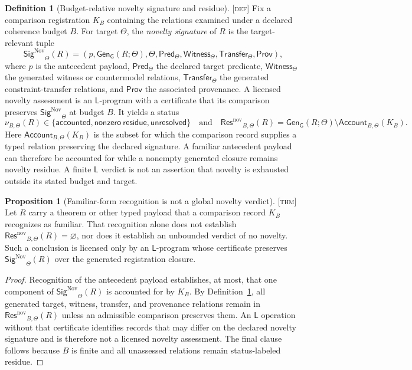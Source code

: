 \documentclass[11pt]{article}
\newcommand{\GOp}{\ensuremath{\mathsf{G}}}
\newcommand{\LOp}{\ensuremath{\mathsf{L}}}
\newcommand{\GenClos}{\ensuremath{\mathsf{Gen}_{\GOp}}}
\newcommand{\NovSig}{\ensuremath{\mathsf{Sig}^{\mathrm{Nov}}}}
\newcommand{\NovRes}{\ensuremath{\mathsf{Res}^{\mathrm{nov}}}}
\newcommand{\Defn}{\textsc{[def]}}
\newcommand{\Thm}{\textsc{[thm]}}
\theoremstyle{definition}
\newtheorem{sdefinition}{Definition}
\newtheorem{sproposition}{Proposition}
\begin{document}
\begin{sdefinition}[Budget-relative novelty signature and residue]
\label{def:novelty-residue}
\Defn{} Fix a comparison registration $K_B$ containing the relations examined
under a declared coherence budget $B$. For target $\Theta$, the
\emph{novelty signature} of $R$ is the target-relevant tuple
\begin{equation}
\NovSig_{\Theta}(R)=
\left(
 p,\GenClos(R;\Theta),\Theta,
 \mathsf{Pred}_{\Theta},\mathsf{Witness}_{\Theta},
 \mathsf{Transfer}_{\Theta},\mathsf{Prov}
\right),
\label{eq:novelty-signature}
\end{equation}
where $p$ is the antecedent payload, $\mathsf{Pred}_{\Theta}$ the declared target
predicate, $\mathsf{Witness}_{\Theta}$ the generated witness or countermodel
relations, $\mathsf{Transfer}_{\Theta}$ the generated constraint-transfer
relations, and $\mathsf{Prov}$ the associated provenance. A licensed novelty
assessment is an $\LOp$-program with a certificate that its comparison preserves
$\NovSig_{\Theta}$ at budget $B$. It yields a status
\begin{equation}
\nu_{B,\Theta}(R)\in
\{\mathsf{accounted},\mathsf{nonzero\ residue},\mathsf{unresolved}\}
\quad\text{and}\quad
\NovRes_{B,\Theta}(R)
 =\GenClos(R;\Theta)\setminus\mathsf{Account}_{B,\Theta}(K_B).
\label{eq:novelty-residue}
\end{equation}
Here $\mathsf{Account}_{B,\Theta}(K_B)$ is the subset for which the comparison
record supplies a typed relation preserving the declared signature. A familiar
antecedent payload can therefore be accounted for while a nonempty generated
closure remains novelty residue. A finite $\LOp$ verdict is not an assertion that
novelty is exhausted outside its stated budget and target.
\end{sdefinition}

\begin{sproposition}[Familiar-form recognition is not a global novelty verdict]
\label{prop:familiar-form-not-novelty-verdict}
\Thm{} Let $R$ carry a theorem or other typed payload that a comparison record
$K_B$ recognizes as familiar. That recognition alone does not establish
$\NovRes_{B,\Theta}(R)=\varnothing$, nor does it establish an unbounded verdict
of no novelty. Such a conclusion is licensed only by an $\LOp$-program whose
certificate preserves $\NovSig_{\Theta}(R)$ over the generated registration
closure.
\end{sproposition}

\begin{proof}
Recognition of the antecedent payload establishes, at most, that one component of
$\NovSig_{\Theta}(R)$ is accounted for by $K_B$. By
Definition~\ref{def:novelty-residue}, all generated target, witness, transfer, and
provenance relations remain in $\NovRes_{B,\Theta}(R)$ unless an admissible
comparison preserves them. An $\LOp$ operation without that certificate identifies
records that may differ on the declared novelty signature and is therefore not a
licensed novelty assessment. The final clause follows because $B$ is finite and
all unassessed relations remain status-labeled residue.
\end{proof}
\end{document}
